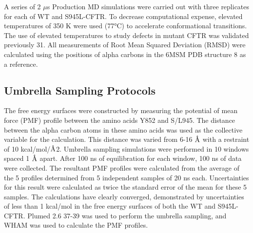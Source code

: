 A series of 2 $\mu$s Production MD simulations were carried out with three replicates for each of WT and S945L-CFTR. To decrease computational expense, elevated temperatures of 350 K were used (77°C) to accelerate conformational transitions. The use of elevated temperatures to study defects in mutant CFTR was validated previously \cite{wong2022}31. All measurements of Root Mean Squared Deviation (RMSD) were calculated using the positions of alpha carbons in the 6MSM PDB structure 8 as a reference. 

\subsection{Umbrella Sampling Protocols}
The free energy surfaces were constructed by measuring the potential of mean force (PMF) profile between the amino acids Y852 and S/L945. The distance between the alpha carbon atoms in these amino acids was used as the collective variable for the calculation. This distance was varied from 6-16 $\mbox{\textup{\AA}}$ with a restraint of 10 kcal/mol/$\mbox{\textup{\AA}}$2. Umbrella sampling simulations were performed in 10 windows spaced 1 $\mbox{\textup{\AA}}$ apart. After 100 ns of equilibration for each window, 100 ns of data were collected. The resultant PMF profiles were calculated from the average of the 5 profiles determined from 5 independent samples of 20 ns each. Uncertainties for this result were calculated as twice the standard error of the mean for these 5 samples. The calculations have clearly converged, demonstrated by uncertainties of less than 1 kcal/mol in the free energy surfaces of both the WT and S945L-CFTR. Plumed 2.6 \cite{bonomi2009, tribello2014, bonomi2019}37-39 was used to perform the umbrella sampling, and WHAM \cite{grossfield2012} was used to calculate the PMF profiles. 
